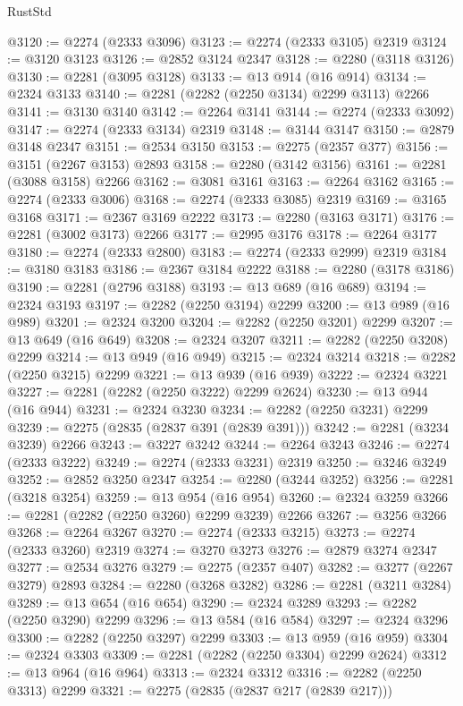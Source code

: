 \begin{lexlean}{RustStd}
\begin{coremodule}
@3120 := @2274 (@2333 @3096)
@3123 := @2274 (@2333 @3105) @2319
@3124 := @3120 @3123
@3126 := @2852 @3124 @2347
@3128 := @2280 (@3118 @3126)
@3130 := @2281 (@3095 @3128)
@3133 := @13 @914 (@16 @914)
@3134 := @2324 @3133
@3140 := @2281 (@2282 (@2250 @3134) @2299 @3113) @2266
@3141 := @3130 @3140
@3142 := @2264 @3141
@3144 := @2274 (@2333 @3092)
@3147 := @2274 (@2333 @3134) @2319
@3148 := @3144 @3147
@3150 := @2879 @3148 @2347
@3151 := @2534 @3150
@3153 := @2275 (@2357 @377)
@3156 := @3151 (@2267 @3153) @2893
@3158 := @2280 (@3142 @3156)
@3161 := @2281 (@3088 @3158) @2266
@3162 := @3081 @3161
@3163 := @2264 @3162
@3165 := @2274 (@2333 @3006)
@3168 := @2274 (@2333 @3085) @2319
@3169 := @3165 @3168
@3171 := @2367 @3169 @2222
@3173 := @2280 (@3163 @3171)
@3176 := @2281 (@3002 @3173) @2266
@3177 := @2995 @3176
@3178 := @2264 @3177
@3180 := @2274 (@2333 @2800)
@3183 := @2274 (@2333 @2999) @2319
@3184 := @3180 @3183
@3186 := @2367 @3184 @2222
@3188 := @2280 (@3178 @3186)
@3190 := @2281 (@2796 @3188)
@3193 := @13 @689 (@16 @689)
@3194 := @2324 @3193
@3197 := @2282 (@2250 @3194) @2299
@3200 := @13 @989 (@16 @989)
@3201 := @2324 @3200
@3204 := @2282 (@2250 @3201) @2299
@3207 := @13 @649 (@16 @649)
@3208 := @2324 @3207
@3211 := @2282 (@2250 @3208) @2299
@3214 := @13 @949 (@16 @949)
@3215 := @2324 @3214
@3218 := @2282 (@2250 @3215) @2299
@3221 := @13 @939 (@16 @939)
@3222 := @2324 @3221
@3227 := @2281 (@2282 (@2250 @3222) @2299 @2624)
@3230 := @13 @944 (@16 @944)
@3231 := @2324 @3230
@3234 := @2282 (@2250 @3231) @2299
@3239 := @2275 (@2835 (@2837 @391 (@2839 @391)))
@3242 := @2281 (@3234 @3239) @2266
@3243 := @3227 @3242
@3244 := @2264 @3243
@3246 := @2274 (@2333 @3222)
@3249 := @2274 (@2333 @3231) @2319
@3250 := @3246 @3249
@3252 := @2852 @3250 @2347
@3254 := @2280 (@3244 @3252)
@3256 := @2281 (@3218 @3254)
@3259 := @13 @954 (@16 @954)
@3260 := @2324 @3259
@3266 := @2281 (@2282 (@2250 @3260) @2299 @3239) @2266
@3267 := @3256 @3266
@3268 := @2264 @3267
@3270 := @2274 (@2333 @3215)
@3273 := @2274 (@2333 @3260) @2319
@3274 := @3270 @3273
@3276 := @2879 @3274 @2347
@3277 := @2534 @3276
@3279 := @2275 (@2357 @407)
@3282 := @3277 (@2267 @3279) @2893
@3284 := @2280 (@3268 @3282)
@3286 := @2281 (@3211 @3284)
@3289 := @13 @654 (@16 @654)
@3290 := @2324 @3289
@3293 := @2282 (@2250 @3290) @2299
@3296 := @13 @584 (@16 @584)
@3297 := @2324 @3296
@3300 := @2282 (@2250 @3297) @2299
@3303 := @13 @959 (@16 @959)
@3304 := @2324 @3303
@3309 := @2281 (@2282 (@2250 @3304) @2299 @2624)
@3312 := @13 @964 (@16 @964)
@3313 := @2324 @3312
@3316 := @2282 (@2250 @3313) @2299
@3321 := @2275 (@2835 (@2837 @217 (@2839 @217)))

\end{coremodule}
\end{lexlean}
